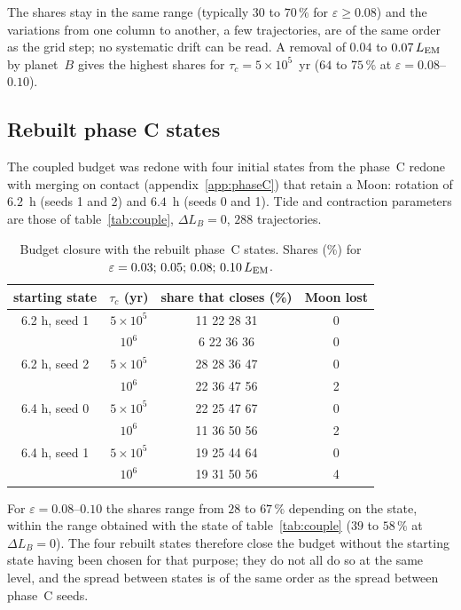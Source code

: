 \documentclass[11pt,a4paper]{article}
\newcommand{\LEM}{\ensuremath{L_{\rm EM}}}
\begin{document}
The shares stay in the same range (typically $30$ to $70\,\%$ for $\varepsilon\ge0.08$) and the variations from one column to another, a few trajectories, are of the same order as the grid step; no systematic drift can be read. A removal of $0.04$ to $0.07\,\LEM$ by planet~$B$ gives the highest shares for $\tau_c=5\times10^5$~yr ($64$ to $75\,\%$ at $\varepsilon=0.08$--$0.10$).

\subsection{Rebuilt phase C states}

The coupled budget was redone with four initial states from the phase~C redone with merging on contact (appendix~\ref{app:phaseC}) that retain a Moon: rotation of $6.2$~h (seeds 1 and 2) and $6.4$~h (seeds 0 and 1). Tide and contraction parameters are those of table~\ref{tab:couple}, $\Delta L_B=0$, $288$ trajectories.

\begin{table}[htbp]
\centering\footnotesize\setlength{\tabcolsep}{4pt}
\caption{Budget closure with the rebuilt phase~C states. Shares (\%) for $\varepsilon=0.03;\,0.05;\,0.08;\,0.10\,\LEM$.\label{tab:refondu}}
\begin{tabular}{cccc}\toprule starting state & $\tau_c$ (yr) & share that closes (\%) & Moon lost\\\midrule
6.2 h, seed 1 & $5\times10^5$ & 11 22 28 31 & 0\\ & $10^6$ & 6 22 36 36 & 0\\
6.2 h, seed 2 & $5\times10^5$ & 28 28 36 47 & 0\\ & $10^6$ & 22 36 47 56 & 2\\
6.4 h, seed 0 & $5\times10^5$ & 22 25 47 67 & 0\\ & $10^6$ & 11 36 50 56 & 2\\
6.4 h, seed 1 & $5\times10^5$ & 19 25 44 64 & 0\\ & $10^6$ & 19 31 50 56 & 4\\\bottomrule\end{tabular}
\end{table}

For $\varepsilon=0.08$--$0.10$ the shares range from $28$ to $67\,\%$ depending on the state, within the range obtained with the state of table~\ref{tab:couple} ($39$ to $58\,\%$ at $\Delta L_B=0$). The four rebuilt states therefore close the budget without the starting state having been chosen for that purpose; they do not all do so at the same level, and the spread between states is of the same order as the spread between phase~C seeds.
\end{document}
